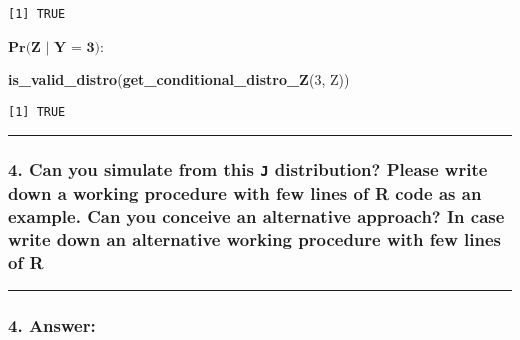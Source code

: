 \documentclass[
]{article}
\newenvironment{Shaded}{\begin{snugshade}}{\end{snugshade}}
\newcommand{\DecValTok}[1]{\textcolor[rgb]{0.00,0.00,0.81}{#1}}
\newcommand{\FunctionTok}[1]{\textcolor[rgb]{0.13,0.29,0.53}{\textbf{#1}}}
\newcommand{\NormalTok}[1]{#1}
\begin{document}
\begin{verbatim}
[1] TRUE
\end{verbatim}

\(\textbf{Pr(Z | Y = 3)}\):

\begin{Shaded}
\begin{Highlighting}[]
\FunctionTok{is\_valid\_distro}\NormalTok{(}\FunctionTok{get\_conditional\_distro\_Z}\NormalTok{(}\DecValTok{3}\NormalTok{, Z))}
\end{Highlighting}
\end{Shaded}

\begin{verbatim}
[1] TRUE
\end{verbatim}

\begin{center}\rule{0.5\linewidth}{0.5pt}\end{center}

\bigskip

\hypertarget{can-you-simulate-from-this-j-distribution-please-write-down-a-working-procedure-with-few-lines-of-r-code-as-an-example.-can-you-conceive-an-alternative-approach-in-case-write-down-an-alternative-working-procedure-with-few-lines-of-r}{%
\subsubsection{\texorpdfstring{4. Can you simulate from this \texttt{J}
distribution? Please write down a working procedure with few lines of R
code as an example. Can you conceive an alternative approach? In case
write down an alternative working procedure with few lines of
R}{4. Can you simulate from this J distribution? Please write down a working procedure with few lines of R code as an example. Can you conceive an alternative approach? In case write down an alternative working procedure with few lines of R}}\label{can-you-simulate-from-this-j-distribution-please-write-down-a-working-procedure-with-few-lines-of-r-code-as-an-example.-can-you-conceive-an-alternative-approach-in-case-write-down-an-alternative-working-procedure-with-few-lines-of-r}}

\begin{center}\rule{0.5\linewidth}{0.5pt}\end{center}

\hypertarget{answer-3}{%
\subsubsection{4. Answer:}\label{answer-3}}
\end{document}
